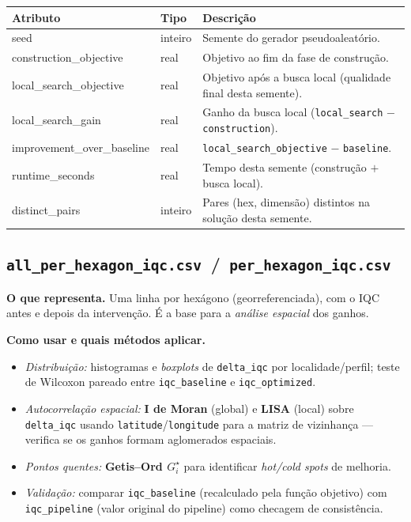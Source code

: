\documentclass[11pt,a4paper]{article}
\begin{document}
\begin{center}\small
\begin{tabular}{@{}>{\ttfamily}l l p{8.0cm}@{}}
\toprule
\normalfont Atributo & \normalfont Tipo & \normalfont Descrição \\
\midrule
seed                    & inteiro & Semente do gerador pseudoaleatório. \\
construction\_objective & real & Objetivo ao fim da fase de construção. \\
local\_search\_objective& real & Objetivo após a busca local (qualidade final desta semente). \\
local\_search\_gain     & real & Ganho da busca local (\texttt{local\_search} $-$ \texttt{construction}). \\
improvement\_over\_baseline & real & \texttt{local\_search\_objective} $-$ \texttt{baseline}. \\
runtime\_seconds        & real & Tempo desta semente (construção $+$ busca local). \\
distinct\_pairs         & inteiro & Pares (hex, dimensão) distintos na solução desta semente. \\
\bottomrule
\end{tabular}
\end{center}

\subsection{\texttt{all\_per\_hexagon\_iqc.csv} \,/\, \texttt{per\_hexagon\_iqc.csv}}

\textbf{O que representa.} Uma linha por hexágono (georreferenciada), com o IQC
antes e depois da intervenção. É a base para a \emph{análise espacial} dos
ganhos.

\textbf{Como usar e quais métodos aplicar.}
\begin{itemize}\setlength\itemsep{1pt}
\item \emph{Distribuição:} histogramas e \emph{boxplots} de \texttt{delta\_iqc}
por localidade/perfil; teste de Wilcoxon pareado entre \texttt{iqc\_baseline} e
\texttt{iqc\_optimized}.
\item \emph{Autocorrelação espacial:} \textbf{I de Moran} (global) e \textbf{LISA}
(local) sobre \texttt{delta\_iqc} usando \texttt{latitude}/\texttt{longitude} para
a matriz de vizinhança --- verifica se os ganhos formam aglomerados espaciais.
\item \emph{Pontos quentes:} \textbf{Getis--Ord $G_i^\star$} para identificar
\emph{hot/cold spots} de melhoria.
\item \emph{Validação:} comparar \texttt{iqc\_baseline} (recalculado pela função
objetivo) com \texttt{iqc\_pipeline} (valor original do pipeline) como checagem de
consistência.
\end{itemize}
\end{document}
